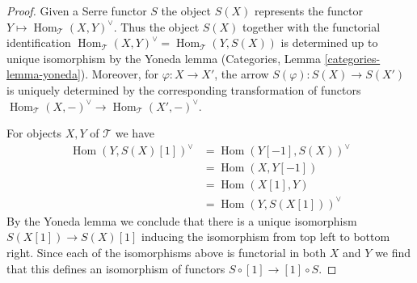 \documentclass{stacks-project}
\theoremstyle{plain}
\theoremstyle{definition}
\theoremstyle{remark}
\numberwithin{equation}{subsection}
\def\Hom{\mathop{\mathrm{Hom}}\nolimits}
\begin{document}
\begin{proof}
Given a Serre functor $S$ the object $S(X)$ represents
the functor $Y \mapsto \Hom_\mathcal{T}(X, Y)^\vee$.
Thus the object $S(X)$ together with the functorial identification
$\Hom_\mathcal{T}(X, Y)^\vee = \Hom_\mathcal{T}(Y, S(X))$
is determined up to unique isomorphism by the Yoneda lemma
(Categories, Lemma \ref{categories-lemma-yoneda}).
Moreover, for $\varphi : X \to X'$, the arrow $S(\varphi) : S(X) \to S(X')$
is uniquely determined by the corresponding transformation of functors
$\Hom_\mathcal{T}(X, -)^\vee \to \Hom_\mathcal{T}(X', -)^\vee$.

\medskip\noindent
For objects $X, Y$ of $\mathcal{T}$ we have
\begin{align*}
\Hom(Y, S(X)[1])^\vee
& =
\Hom(Y[-1], S(X))^\vee \\
& =
\Hom(X, Y[-1]) \\
& =
\Hom(X[1], Y) \\
& =
\Hom(Y, S(X[1]))^\vee
\end{align*}
By the Yoneda lemma we conclude that there is a unique isomorphism
$S(X[1]) \to S(X)[1]$ inducing the isomorphism from top left to bottom right.
Since each of the isomorphisms above is functorial in both $X$ and $Y$
we find that this defines an isomorphism of functors
$S \circ [1] \to [1] \circ S$.


\end{proof}
\end{document}
